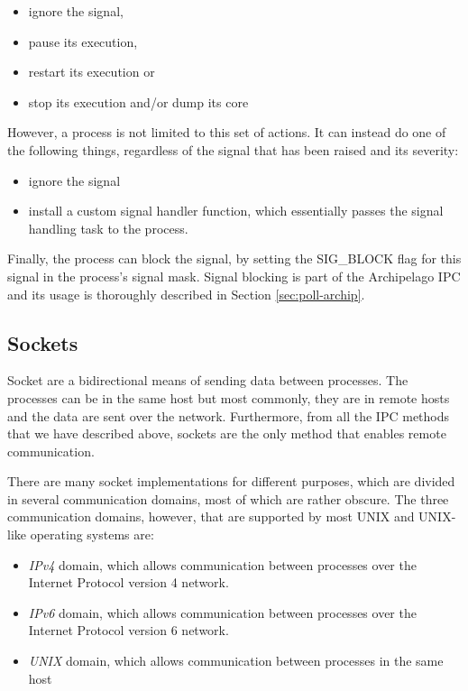 \begin{itemize}
	\item ignore the signal,
	\item pause its execution,
	\item restart its execution or
	\item stop its execution and/or dump its core
\end{itemize}

However, a process is not limited to this set of actions. It can instead do one 
of the following things, regardless of the signal that has been raised and its 
severity:

\begin{itemize}
	\item ignore the signal
	\item install a custom signal handler function, which essentially 
		passes the signal handling task to the process.
\end{itemize}

Finally, the process can block the signal, by setting the SIG\_BLOCK flag for 
this signal in the process's signal mask. Signal blocking is part of the 
Archipelago IPC and its usage is thoroughly described in Section 
\ref{sec:poll-archip}.

\subsection{Sockets}

Socket are a bidirectional means of sending data between processes. The 
processes can be in the same host but most commonly, they are in remote hosts 
and the data are sent over the network. Furthermore, from all the IPC methods 
that we have described above, sockets are the only method that enables remote 
communication. 

There are many socket implementations for different purposes, which are divided 
in several communication domains, most of which are rather obscure. The three 
communication domains, however, that are supported by most UNIX and UNIX-like 
operating systems are:

\begin{itemize}
	\item \textit{IPv4} domain, which allows communication between 
		processes over the Internet Protocol version 4 network.
	\item \textit{IPv6} domain, which allows communication between 
		processes over the Internet Protocol version 6 network.
	\item \textit{UNIX} domain, which allows communication between 
		processes in the same host
\end{itemize}

